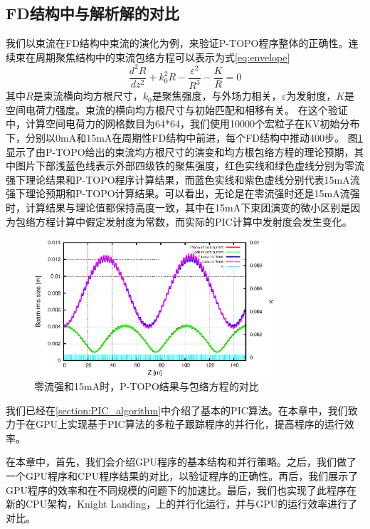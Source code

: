 \subsection{FD结构中与解析解的对比}
我们以束流在FD结构中束流的演化为例，来验证P-TOPO程序整体的正确性。连续束在周期聚焦结构中的束流包络方程可以表示为式\ref{eq:envelope}\cite{wangler1998particle,chen1994nonlinear}
\begin{equation}\label{eq:envelope}
  \frac{{{d}^{2}}R}{d{{z}^{2}}}+k_{0}^{2}R-\frac{{{\varepsilon }^{2}}}{{{R}^{3}}}-\frac{K}{R}=0
\end{equation}
其中$R$是束流横向均方根尺寸，$k_0$是聚焦强度，与外场力相关，$\varepsilon$为发射度，$K$是空间电荷力强度。束流的横向均方根尺寸与初始匹配和相移有关。
在这个验证中，计算空间电荷力的网格数目为64*64，我们使用10000个宏粒子在KV初始分布下，分别以0mA和15mA在周期性FD结构中前进，每个FD结构中推动400步。
图\ref{fig:P_TOPO_verification2}显示了由P-TOPO给出的束流均方根尺寸的演变和均方根包络方程的理论预期，其中图片下部浅蓝色线表示外部四级铁的聚焦强度，红色实线和绿色虚线分别为零流强下理论结果和P-TOPO程序计算结果，而蓝色实线和紫色虚线分别代表15mA流强下理论预期和P-TOPO计算结果。可以看出，无论是在零流强时还是15mA流强时，计算结果与理论值都保持高度一致，其中在15mA下束团演变的微小区别是因为包络方程计算中假定发射度为常数，而实际的PIC计算中发射度会发生变化。

\begin{figure}[!htb]
    \centering
    \includegraphics[width=0.8\textwidth]{Img/P_TOPO_verification2.eps}
    \caption{零流强和15mA时，P-TOPO结果与包络方程的对比}
    \label{fig:P_TOPO_verification2}
\end{figure}
我们已经在\ref{section:PIC_algorithm}中介绍了基本的PIC算法。在本章中，我们致力于在GPU上实现基于PIC算法的多粒子跟踪程序的并行化，提高程序的运行效率。

在本章中，首先，我们会介绍GPU程序的基本结构和并行策略。之后，我们做了一个GPU程序和CPU程序结果的对比，以验证程序的正确性。再后，我们展示了GPU程序的效率和在不同规模的问题下的加速比。最后，我们也实现了此程序在新的CPU架构，Knight Landing，上的并行化运行，并与GPU的运行效率进行了对比。

